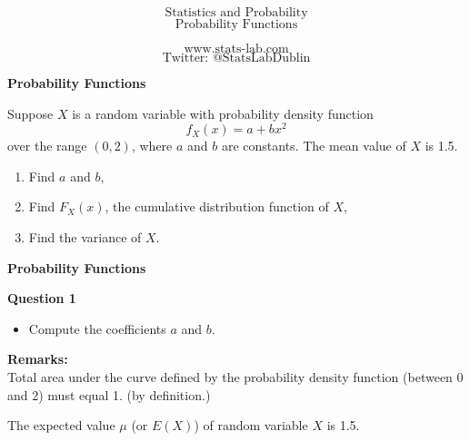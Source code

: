 \documentclass[12pt]{article}
\begin{document}
\Huge
\[\mbox{Statistics and Probability}\]
\LARGE
\[\mbox{Probability Functions}\]

\Large
\[\mbox{www.stats-lab.com}\]
\[\mbox{Twitter: @StatsLabDublin}\]

\newpage

{\LARGE
\begin{center}
\textbf{Probability Functions}\\
\end{center}
\bigskip
Suppose $X$ is a random variable with probability density function
\[f_X(x) = a + bx^2\] over the range $(0,2)$, where $a$ and $b$ are constants.
The mean value of $X$ is 1.5.

\begin{enumerate}
\item Find $a$ and $b$,
\item Find $F_X(x)$, the cumulative distribution function of $X$,
\item Find the variance of $X$.
\end{enumerate}
}

\newpage
{\LARGE
\begin{center}
\textbf{Probability Functions}\\
\end{center}
\bigskip
\textbf{Question 1}\\
\begin{itemize}
\item Compute the coefficients $a$ and $b$.
\end{itemize}

\textbf{Remarks:}\\
Total area under the curve defined by the probability density function (between 0 and 2) must equal 1. (by definition.)\\ \bigskip

The expected value $\mu$ (or $E(X)$) of random variable $X$ is 1.5.


}
\end{document}
